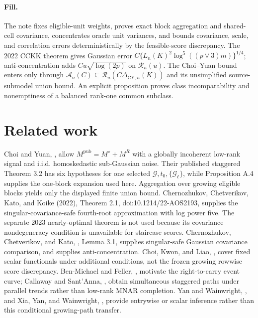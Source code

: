 \documentclass{article}
\begin{document}
\paragraph{Fill.} The note fixes eligible-unit weights, proves exact block aggregation and shared-cell covariance, concentrates oracle unit variances, and bounds covariance, scale, and correlation errors deterministically by the feasible-score discrepancy.  The 2022 CCKK theorem gives Gaussian error \(C\{L_n(K)^2\log^5((p\vee3)m)\}^{1/4}\); anti-concentration adds \(Cu\sqrt{\log(2p)}\) on \(\mathcal R_n(u)\).  The Choi--Yuan bound enters only through \(\mathcal A_n(C)\subseteq\mathcal R_n(C\Delta_{\mathrm{CY},n}(K))\) and its unsimplified source-submodel union bound.  An explicit proposition proves class incomparability and nonemptiness of a balanced rank-one common subclass.

\section{Related work}

Choi and Yuan, \cite{ChoiYuan2024MNAR}, allow \(M^{\mathrm{pub}}=M^\star+M^R\) with a globally incoherent low-rank signal and i.i.d. homoskedastic sub-Gaussian noise.  Their published staggered Theorem 3.2 has six hypotheses for one selected \(\mathcal G,t_0,\{\mathcal G_\ell\}\), while Proposition A.4 supplies the one-block expansion used here.  Aggregation over growing eligible blocks yields only the displayed finite union bound.  Chernozhukov, Chetverikov, Kato, and Koike (2022), Theorem 2.1, doi:10.1214/22-AOS2193, supplies the singular-covariance-safe fourth-root approximation with log power five.  The separate 2023 nearly-optimal theorem is not used because its covariance nondegeneracy condition is unavailable for staircase scores.  Chernozhukov, Chetverikov, and Kato, \cite{ChernozhukovChetverikovKato2013Maxima}, Lemma 3.1, supplies singular-safe Gaussian covariance comparison, and \cite{ChernozhukovChetverikovKato2014Bands} supplies anti-concentration.  Choi, Kwon, and Liao, \cite{ChoiKwonLiao2024Completion}, cover fixed scalar functionals under additional conditions, not the frozen growing rowwise score discrepancy.  Ben-Michael and Feller, \cite{BenMichaelFeller2026Discussion}, motivate the right-to-carry event curve; Callaway and Sant'Anna, \cite{CallawaySantAnna2021DID}, obtain simultaneous staggered paths under parallel trends rather than low-rank MNAR completion.  Yan and Wainwright, \cite{YanWainwright2024Entrywise}, and Xia, Yan, and Wainwright, \cite{XiaYanWainwright2024ACA}, provide entrywise or scalar inference rather than this conditional growing-path transfer.
\end{document}

